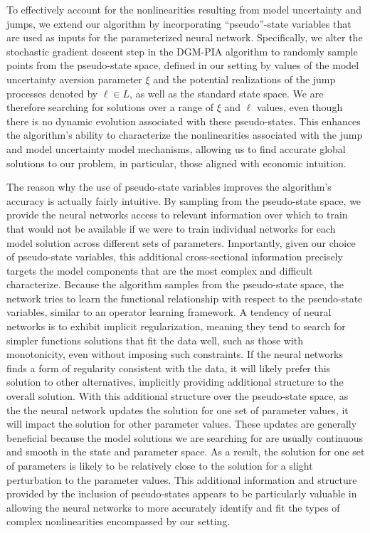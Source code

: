 \documentclass[12pt]{article}
\begin{document}
To effectively account for the nonlinearities resulting from model uncertainty and jumps, we extend our algorithm by incorporating ``pseudo''-state variables that are used as inputs for the parameterized neural network. Specifically, we alter the stochastic gradient descent step in the DGM-PIA algorithm to randomly sample points from the pseudo-state space, defined in our setting by values of the model uncertainty aversion parameter $\xi$ and the potential realizations of the jump processes denoted by $\ell \in L$, as well as the standard state space. We are therefore searching for solutions over a range of $\xi$ and $\ell$ values, even though there is no dynamic evolution associated with these pseudo-states. This enhances the algorithm's ability to characterize the nonlinearities associated with the jump and model uncertainty model mechanisms, allowing us to find accurate global solutions to our problem, in particular, those aligned with economic intuition.

The reason why the use of pseudo-state variables improves the algorithm's accuracy is actually fairly intuitive. By sampling from the pseudo-state space, we provide the neural networks access to relevant information over which to train that would not be available if we were to train individual networks for each model solution across different sets of parameters. Importantly, given our choice of pseudo-state variables, this additional cross-sectional information precisely targets the model components that are the most complex and difficult characterize. Because the algorithm samples from the pseudo-state space, the network tries to learn the functional relationship with respect to the pseudo-state variables, similar to an operator learning framework. A tendency of neural networks is to exhibit implicit regularization, meaning they tend to search for simpler functions solutions that fit the data well, such as those with monotonicity, even without imposing such constraints. If the neural networks finds a form of regularity consistent with the data, it will likely prefer this solution to other alternatives, implicitly providing additional structure to the overall solution. With this additional structure over the pseudo-state space, as the the neural network updates the solution for one set of parameter values, it will impact the solution for other parameter values. These updates are generally beneficial because the model solutions we are searching for are usually continuous and smooth in the state and parameter space. As a result, the solution for one set of parameters is likely to be relatively close to the solution for a slight perturbation to the parameter values. This additional information and structure provided by the inclusion of pseudo-states appears to be particularly valuable in allowing the neural networks to more accurately identify and fit the types of complex nonlinearities encompassed by our setting.
\end{document}
